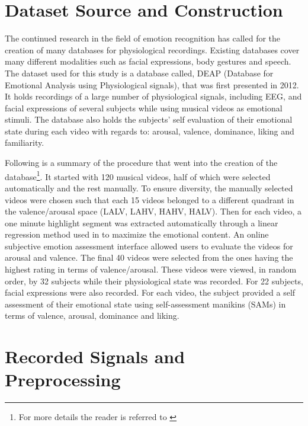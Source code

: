 \documentclass[12pt, a4paper, fleqn]{memoir}%
\begin{document}
\section{Dataset Source and Construction}
\label{sec:DatasetSource}
The continued research in the field of emotion recognition has called for the creation of many databases for physiological recordings. Existing databases cover many different modalities such as facial expressions, body gestures and speech. The dataset used for this study is a database called, DEAP (Database for Emotional Analysis using Physiological signals), that was first presented in 2012. It holds recordings of a large number of physiological signals, including EEG, and facial expressions of several subjects while using musical videos as emotional stimuli. The database also holds the subjects' self evaluation of their emotional state during each video with regards to: arousal, valence, dominance, liking and familiarity\cite{koelstra2012deap}.

Following is a summary of the procedure that went into the creation of the database\footnote{For more details the reader is referred to \cite{koelstra2012deap}}. It started with 120 musical videos, half of which were selected automatically and the rest manually. To ensure diversity, the manually selected videos were chosen such that each 15 videos belonged to a different quadrant in the valence/arousal space (LALV, LAHV, HAHV, HALV). Then for each video, a one minute highlight segment was extracted automatically through a linear regression method used in \cite{soleymani2008bayesian} to maximize the emotional content. An online subjective emotion assessment interface allowed users to evaluate the videos for arousal and valence. The final 40 videos were selected from the ones having the highest rating in terms of valence/arousal. These videos were viewed, in random order, by 32 subjects while their physiological state was recorded. For 22 subjects, facial expressions were also recorded. For each video, the subject provided a self assessment of their emotional state using self-assessment manikins (SAMs) in terms of valence, arousal, dominance and liking\cite{koelstra2012deap}.

\section{Recorded Signals and Preprocessing}
\label{sec:preprocessing}
\end{document}
